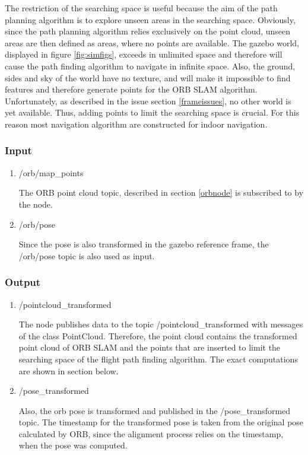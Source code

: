	The restriction of the searching space is useful because the aim of the path planning algorithm is to explore unseen areas in the searching space. Obviously, 
	since the path planning algorithm relies exclusively on the point cloud, unseen areas are then defined as areas, where no points are available. The gazebo world, 
	displayed in figure \ref{fig:simfigs}, exceeds in unlimited space and therefore will cause the path finding algorithm to navigate in infinite space. Also, the ground, sides and 
	sky of the world have no texture, and will make it impossible to find features and therefore generate points for the ORB SLAM algorithm. Unfortunately, 
	as described in the issue section \ref{frameissues}, no other world is yet available. Thus, adding points to 
	limit the searching space is crucial. For this reason most navigation algorithm are constructed for indoor navigation.
	
	\subsubsection{Input}
	
	\begin{enumerate}
	\item{/orb/map\_points}
	
	The ORB point cloud topic, described in section \ref{orbnode} is subscribed to by the node. 
	
	\item{/orb/pose}
	
	Since the pose is also transformed in the gazebo reference frame, the /orb/pose topic is also used as input. 
	
	\end{enumerate}
	
	\subsubsection{Output}
	
	\begin{enumerate}
	\item{/pointcloud\_transformed}
	
	The node publishes data to the topic /pointcloud\_transformed with messages of the class PointCloud. Therefore, the point cloud contains the transformed 
	point cloud of ORB SLAM and the points that are inserted to limit the searching space of the flight path finding algorithm. 
	The exact computations are shown 
	in section below. 
	
	\item{/pose\_transformed}
	
	Also, the orb pose is transformed and published in the /pose\_transformed topic. The timestamp for the transformed pose is taken from the original pose 
	calculated by ORB, since the alignment process relies on the timestamp, when the pose was computed. 
	
	\end{enumerate}
	
